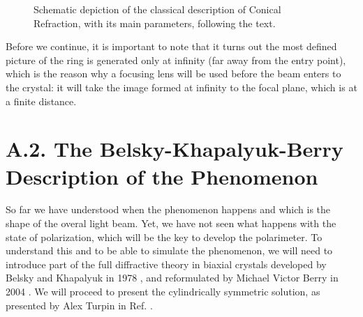 \documentclass[11pt, a4paper, twoside]{article} %
\begin{document}
\begin{figure}[h!] 
     \centering 
    \caption{Schematic depiction of the classical description of Conical Refraction, with its main parameters, following the text.}
    \label{fig:CR}
\end{figure}
Before we continue, it is important to note that it turns out the most defined picture of the ring is generated only at infinity (far away from the entry point), which is the reason why a focusing lens will be used before the beam enters to the crystal: it will take the image formed at infinity to the focal plane, which is at a finite distance.


\section*{A.2. The Belsky-Khapalyuk-Berry Description of the Phenomenon }

So far we have understood when the phenomenon happens and which is the shape of the overal light beam. Yet, we have not seen what happens with the state of polarization, which will be the key to develop the polarimeter. To understand this and to be able to simulate the phenomenon, we will need to introduce part of the full diffractive theory in biaxial crystals developed by Belsky and Khapalyuk in 1978 \cite{BK1,BK2}, and reformulated by Michael Victor Berry in 2004 \cite{Berry}. We will proceed to present the cylindrically symmetric solution, as presented by Alex Turpin in Ref. \cite{Turpin}.
\end{document}
